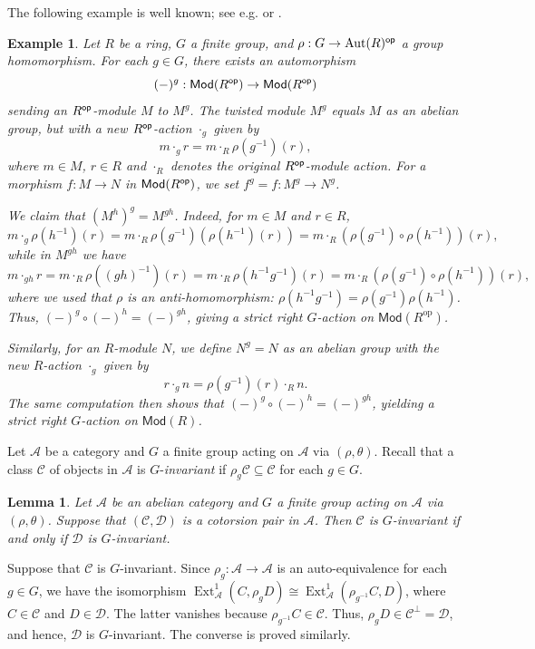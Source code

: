 \documentclass[12pt,twoside]{amsart}
\theoremstyle{bfupright head,slanted body}
\theoremstyle{bfupright head,upright body}
\theoremstyle{fixed bf head,slanted body}
\newtheorem{lem}[res]{Lemma}            \newtheorem*{lem*}{Lemma}
\theoremstyle{fixed bf head,upright body}
\newtheorem{exa}[res]{Example}           \newtheorem*{exa*}{Example}
\theoremstyle{numbered paragraph}
\newenvironment{prf*}[1][Proof]{%
  \begin{proof}[\bf #1]
    \setcounter{equation}{0}
    \renewcommand{\theequation}{\arabic{equation}}}
  {\end{proof}
}
\numberwithin{equation}{res}
\newcommand{\calC}{\mathcal{C}}
\newcommand{\calA}{\mathcal{A}}
\newcommand{\calD}{\mathcal{D}}
\newcommand{\Mod}{\mathsf{Mod}}
\newcommand{\Rop}{R^{\sf op}}
\newcommand{\op}{\sf op}
\newcommand{\Aut}{\operatorname{Aut}}
\newcommand{\Ext}{\operatorname{Ext}}
\begin{document}
The following example is well known; see e.g. \cite[Example 2.6]{2017Chen} or \cite[Subsection 2.3]{2025Equ}.

\begin{exa} \label{G for RMOD}
Let $R$ be a ring, $G$ a finite group, and $\rho: G \to \Aut(R)^{\op}$ a group homomorphism.
For each $g \in G$, there exists an automorphism
\[
(-)^g: \Mod(R^{\op}) \to \Mod(R^{\op})
\]
sending an $\Rop$-module $M$ to $M^g$.
The \emph{twisted} module $M^g$ equals $M$ as an abelian group, but with a new $R^{\op}$-action $\cdot_g$ given by
\[
m \cdot_g r = m \cdot_R \rho(g^{-1})(r),
\]
where $m \in M$, $r \in R$ and $\cdot_R$ denotes the original $\Rop$-module action.
For a morphism $f: M \to N$ in $\Mod(\Rop)$, we set $f^g = f : M^g \to N^g$.

We claim that \((M^h)^g = M^{gh}\). Indeed, for \(m \in M\) and \(r \in R\),
\[
m \cdot_g \rho(h^{-1})(r)
= m \cdot_R \rho(g^{-1})(\rho(h^{-1})(r))
= m \cdot_R (\rho(g^{-1}) \circ \rho(h^{-1}))(r),
\]
while in \(M^{gh}\) we have
\[
m \cdot_{gh} r
= m \cdot_R \rho((gh)^{-1})(r)
= m \cdot_R \rho(h^{-1} g^{-1})(r)
= m \cdot_R (\rho(g^{-1}) \circ \rho(h^{-1}))(r),
\]
where we used that \(\rho\) is an anti-homomorphism: \(\rho(h^{-1}g^{-1}) = \rho(g^{-1})\rho(h^{-1})\).
Thus, \((-)^g \circ (-)^h = (-)^{gh}\), giving a strict right \(G\)-action on \(\Mod(R^{\mathrm{op}})\).

Similarly, for an $R$-module $N$, we define $N^g = N$ as an abelian group with the new $R$-action $\cdot_g$ given by
\[
r \cdot_g n = \rho(g^{-1})(r) \cdot_R n.
\]
The same computation then shows that \((-)^g \circ (-)^h = (-)^{gh}\), yielding a strict right \(G\)-action on \(\Mod(R)\).
\end{exa}

Let \(\calA\) be a category and \(G\) a finite group acting on \(\calA\) via \((\rho,\theta)\).
Recall that a class \(\calC\) of objects in \(\calA\) is \(G\)-\emph{invariant} if \(\rho_g\calC\subseteq\calC\) for each \(g\in G\).

\begin{lem} \label{D^G G-invariant}
Let \(\calA\) be an abelian category and \(G\) a finite group acting on \(\calA\) via \((\rho,\theta)\).
Suppose that \((\calC,\calD)\) is a cotorsion pair in \(\calA\).
Then \(\calC\) is \(G\)-invariant if and only if \(\calD\) is \(G\)-invariant.
\end{lem}

\begin{prf*}
Suppose that \(\calC\) is \(G\)-invariant.
Since \(\rho_g:\calA\to\calA\) is an auto-equivalence for each \(g\in G\), we have the isomorphism
\(\Ext_{\calA}^1(C,\rho_gD) \cong \Ext_{\calA}^1(\rho_{g^{-1}}C,D)\),
where \(C\in\calC\) and \(D\in\calD\).
The latter vanishes because \(\rho_{g^{-1}}C\in\calC\).
Thus, \(\rho_gD\in \calC^\bot=\calD\), and hence, \(\calD\) is \(G\)-invariant.
The converse is proved similarly.
\end{prf*}
\end{document}
